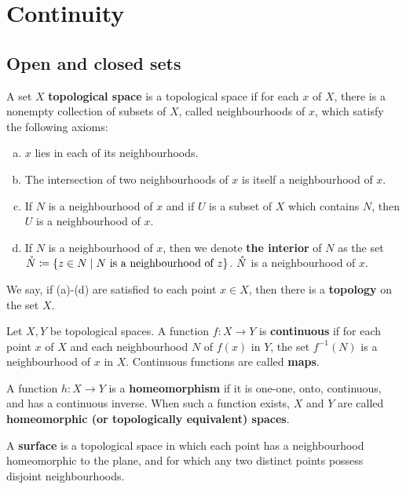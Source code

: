 \chapter{Continuity}

\section{Open and closed sets}

\begin{definition}
    A set $X$ \textbf{topological space} is a topological space if for each $x$ of $X$, there is a nonempty collection of subsets of $X$, called neighbourhoods of $x$, which satisfy the following axioms:
    \begin{enumerate}[(a)]
        \item $x$ lies in each of its neighbourhoods.
        \item The intersection of two neighbourhoods of $x$ is itself a neighbourhood of $x$.
        \item If $N$ is a neighbourhood of $x$ and if $U$ is a subset of $X$ which contains $N$, then $U$ is a neighbourhood of $x$.
        \item If $N$ is a neighbourhood of $x$, then we denote \textbf{the interior} of $N$ as the set $\mathring{N}\coloneq\{z \in N \mid N \text{ is a neighbourhood of $z$}\}$. $\mathring{N}$ is a neighbourhood of $x$.
    \end{enumerate}
    We say, if (a)-(d) are satisfied to each point $x \in X$, then there is a \textbf{topology} on the set $X$.
\end{definition}
\begin{definition}[Map]
    Let $X,Y$ be topological spaces. A function $f\colon X\to Y$ is \textbf{continuous} if for each point $x$ of $X$ and each neighbourhood $N$ of $f(x)$ in $Y$, the set $f^{-1}(N)$ is a neighbourhood of $x$ in $X$. Continuous functions are called \textbf{maps}.
\end{definition}
\begin{definition}[Homeomorphism]
    A function $h\colon X\to Y$ is a \textbf{homeomorphism} if it is one-one, onto, continuous, and has a continuous inverse. When such a function exists, $X$ and $Y$ are called \textbf{homeomorphic (or topologically equivalent) spaces}.
\end{definition}
\begin{definition}[Surface]
    A \textbf{surface} is a topological space in which each point has a neighbourhood homeomorphic to the plane, and for which any two distinct points possess disjoint neighbourhoods.
\end{definition}

